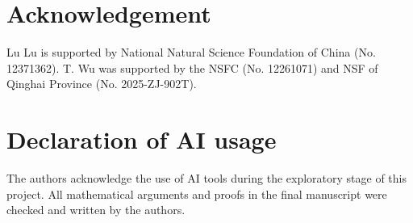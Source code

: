 \documentclass[11pt]{article}
\numberwithin{equation}{section}
\begin{document}
	 \section*{Acknowledgement}
	 Lu Lu is supported by National Natural Science Foundation of China (No. 12371362). T. Wu was supported by the NSFC (No. 12261071) and NSF of Qinghai Province (No. 2025-ZJ-902T).
	 
	 \section*{Declaration of AI usage}
The authors acknowledge the use of AI tools during the exploratory stage of this project. All
mathematical arguments and proofs in the final manuscript were checked and written by the
authors.

	
\end{document}
